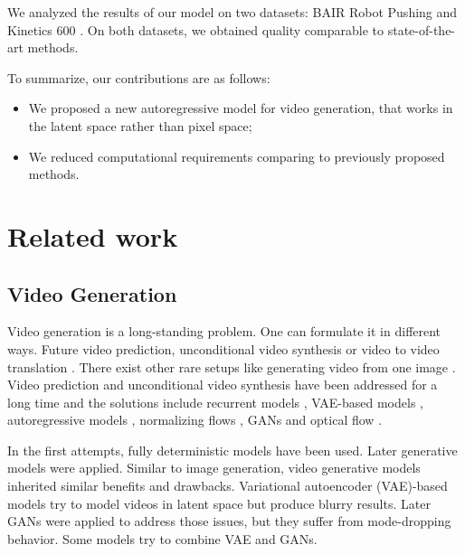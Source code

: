 \documentclass{article}
\newenvironment{itemizetight}
{\vspace{-.5\baselineskip}\begin{itemize}\setlength{\itemsep}{-.25\baselineskip}}
{\end{itemize}\vspace{-.5\baselineskip}}
\begin{document}
We analyzed the results of our model on two datasets: BAIR Robot Pushing \cite{bair_dataset} and Kinetics 600 \cite{kinetics600_dataset}. On both datasets, we obtained quality comparable to state-of-the-art methods.

To summarize, our contributions are as follows:

\begin{itemizetight}
    \item We proposed a new autoregressive model for video generation, that works in the latent space rather than pixel space;
\item We reduced computational requirements comparing to previously proposed methods.
\end{itemizetight}






 \section{Related work}

\subsection{Video Generation}

Video generation is a long-standing problem. One can formulate it in different ways. Future video prediction, unconditional video synthesis or video to video translation \cite{vid2vid, video_from_semantic, vid2vid++}. There exist other rare setups like generating video from one image \cite{singan}.
Video prediction and unconditional video synthesis have been addressed for a long time and the solutions include recurrent models \cite{ulpi, predrnn++, vpb, favp}, VAE-based models \cite{sv2p, uldr, savp, ldrp, svg}, autoregressive models \cite{vm, ulstm, clstm, video_pixel_networks, vt, axial_transformer}, normalizing flows \cite{kumar}, GANs \cite{dmsv, vgan, tgan, mocogan, pvgan, tganv2, dvdgan, dvdgan2} and optical flow \cite{ptrucean, katsunori}.

In the first attempts, fully deterministic models have been used. Later generative models were applied. Similar to image generation, video generative models inherited similar benefits and drawbacks. Variational autoencoder (VAE)-based models try to model videos in latent space but produce blurry results. Later GANs were applied to address those issues, but they suffer from mode-dropping behavior. Some models \cite{savp} try to combine VAE and GANs.
\end{document}
